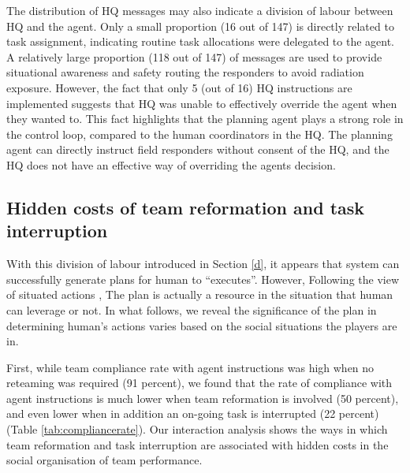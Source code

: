 The distribution of HQ messages may also indicate a division of labour between HQ and the agent. Only a small proportion (16 out of 147) is directly related to task assignment, indicating routine task allocations were delegated to the agent. A relatively large proportion (118 out of 147) of messages are used to provide situational awareness and safety routing the responders to avoid radiation exposure. However, the fact that only 5 (out of 16) HQ instructions are implemented suggests that HQ was unable to effectively override the agent when they wanted to. This fact highlights that the planning agent plays a strong role in the control loop, compared to the human coordinators in the HQ. The planning agent can directly instruct field responders without consent of the HQ, and the HQ does not have an effective way of overriding the agents decision. \\

\subsection{Hidden costs of team reformation and task interruption}\label{sec:study2social}
With this division of labour introduced in Section \ref{d}, it appears that system can successfully generate plans for human to ``executes''. However, Following the view of situated actions \cite{Suchman1987}, The plan is actually a resource in the situation that human can leverage or not. In what follows, we reveal the significance of the plan in determining human's actions varies based on the social situations the players are in. 

First, while team compliance rate with agent instructions was high when no reteaming was required (91 percent), we found that the rate of compliance with agent instructions is much lower when team reformation is involved (50 percent), and even lower when in addition an on-going task is interrupted (22 percent) (Table \ref{tab:compliancerate}). Our interaction analysis shows the ways in which team reformation and task interruption are associated with hidden costs in the social organisation of team performance.  \\

